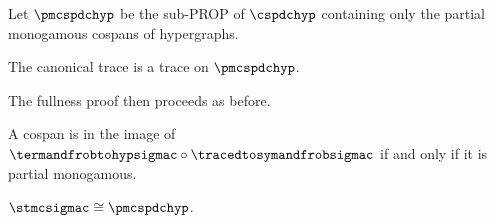 \begin{definition}
    Let \(\pmcspdchyp\) be the sub-PROP of \(\cspdchyp\) containing only the
    partial monogamous cospans of hypergraphs.
\end{definition}

\begin{theorem}
    The canonical trace is a trace on \(\pmcspdchyp\).
\end{theorem}

The fullness proof then proceeds as before.

\begin{theorem}
    A cospan is in the image of
    \(\termandfrobtohypsigmac \circ \tracedtosymandfrobsigmac\) if and only if
    it is partial monogamous.
\end{theorem}

\begin{corollary}
    \(\stmcsigmac \cong \pmcspdchyp\).
\end{corollary}